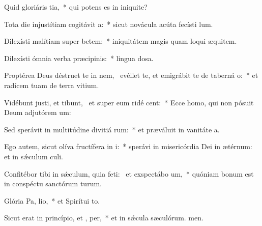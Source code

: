 \item Quid gloriáris  tia,~* qui potens es in iniquite?
\item Tota die injustítiam cogitávit  a:~* sicut novácula acúta fecísti lum.
\item Dilexísti malítiam super betem:~* iniquitátem magis quam loqui æquitem.
\item Dilexísti ómnia verba præcipinis:~* lingua dosa.
\item Proptérea Deus déstruet te in nem,~\pscross{} evéllet te, et emigrábit te de taberná o:~* et radícem tuam de terra vitium.
\item Vidébunt justi, et tibunt,~\pscross{} et super eum ridé  cent:~* Ecce homo, qui non pósuit Deum adjutórem um:
\item Sed sperávit in multitúdine divitiá rum:~* et præváluit in vanitáte a.
\item Ego autem, sicut olíva fructífera in  i:~* sperávi in misericórdia Dei in ætérnum: et in sǽculum culi.
\item Confitébor tibi in sǽculum, quia feti:~\pscross{} et exspectábo  um,~* quóniam bonum est in conspéctu sanctórum turum.
\item Glória Pa,  lio,~* et Spirítui to.
\item Sicut erat in princípio, et ,  per,~* et in sǽcula sæculórum. men.
